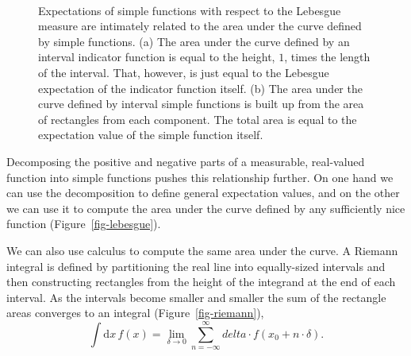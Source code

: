 \documentclass[
  letterpaper,
  DIV=11,
  numbers=noendperiod]{scrartcl}
\begin{document}
\begin{figure}
\begin{minipage}[t]{0.45\linewidth}
{{}

}

\subcaption{\label{fig-simple-area}}
\end{minipage}%
%
\begin{minipage}[t]{0.05\linewidth}

{\centering 

~

}

\end{minipage}%

\caption{\label{fig-integrate}Expectations of simple functions with
respect to the Lebesgue measure are intimately related to the area under
the curve defined by simple functions. (a) The area under the curve
defined by an interval indicator function is equal to the height, \(1\),
times the length of the interval. That, however, is just equal to the
Lebesgue expectation of the indicator function itself. (b) The area
under the curve defined by interval simple functions is built up from
the area of rectangles from each component. The total area is equal to
the expectation value of the simple function itself.}

\end{figure}

Decomposing the positive and negative parts of a measurable, real-valued
function into simple functions pushes this relationship further. On one
hand we can use the decomposition to define general expectation values,
and on the other we can use it to compute the area under the curve
defined by any sufficiently nice function (Figure~\ref{fig-lebesgue}).

We can also use calculus to compute the same area under the curve. A
Riemann integral is defined by partitioning the real line into
equally-sized intervals and then constructing rectangles from the height
of the integrand at the end of each interval. As the intervals become
smaller and smaller the sum of the rectangle areas converges to an
integral (Figure~\ref{fig-riemann}), \[
\int \mathrm{d} x \, f(x)
=
\lim_{\delta \rightarrow 0}
\sum_{n = -\infty}^{\infty} delta \cdot f(x_{0} + n \cdot \delta).
\]
\end{document}
